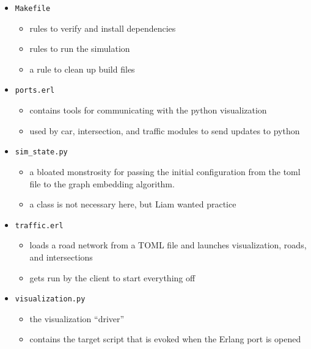 \documentclass{article}
\newcommand{\ttt}[1]{\texttt{#1}}
\begin{document}
\begin{itemize}
\begin{itemize}
	\end{itemize}
	\item \ttt{Makefile}
	\begin{itemize}
		\item rules to verify and install dependencies
		\item rules to run the simulation
		\item a rule to clean up build files
	\end{itemize}
	\item \ttt{ports.erl}
	\begin{itemize}
		\item contains tools for communicating with the python visualization
		\item used by car, intersection, and traffic modules to send updates to python
	\end{itemize}
	\item \ttt{sim\_state.py}
	\begin{itemize}
		\item a bloated monstrosity for passing the initial configuration from the toml file to the graph embedding algorithm.
		\item a class is not necessary here, but Liam wanted practice
	\end{itemize}
	\item \ttt{traffic.erl}
	\begin{itemize} 
		\item loads a road network from a TOML file and launches visualization, roads, and intersections
		\item gets run by the client to start everything off
	\end{itemize}
	\item \ttt{visualization.py}
	\begin{itemize}
		\item the visualization “driver”
		\item contains the target script that is evoked when the Erlang port is opened
	\end{itemize}
\end{itemize}
\end{document}
